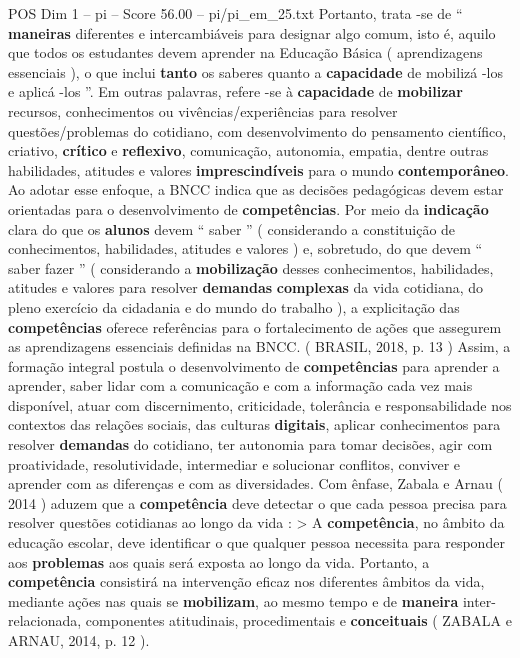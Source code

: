 \begin{textsample}{POS Dim 1 – pi – Score 56.00 – pi/pi\_em\_25.txt}
Portanto, trata -se de “ \textbf{maneiras} diferentes e intercambiáveis para designar algo comum, isto é, aquilo que todos os estudantes devem aprender na Educação Básica ( aprendizagens essenciais ), o que inclui \textbf{tanto} os saberes quanto a \textbf{capacidade} de mobilizá -los e aplicá -los ”.
Em outras palavras, refere -se à \textbf{capacidade} de \textbf{mobilizar} recursos, conhecimentos ou vivências/experiências para resolver questões/problemas do cotidiano, com desenvolvimento do pensamento científico, criativo, \textbf{crítico} e \textbf{reflexivo}, comunicação, autonomia, empatia, dentre outras habilidades, atitudes e valores \textbf{imprescindíveis} para o mundo \textbf{contemporâneo}.
Ao adotar esse enfoque, a BNCC indica que as decisões pedagógicas devem estar orientadas para o desenvolvimento de \textbf{competências}.
Por meio da \textbf{indicação} clara do que os \textbf{alunos} devem “ saber ” ( considerando a constituição de conhecimentos, habilidades, atitudes e valores ) e, sobretudo, do que devem “ saber fazer ” ( considerando a \textbf{mobilização} desses conhecimentos, habilidades, atitudes e valores para resolver \textbf{demandas} \textbf{complexas} da vida cotidiana, do pleno exercício da cidadania e do mundo do trabalho ), a explicitação das \textbf{competências} oferece referências para o fortalecimento de ações que assegurem as aprendizagens essenciais definidas na BNCC. ( BRASIL, 2018, p. 13 ) Assim, a formação integral postula o desenvolvimento de \textbf{competências} para aprender a aprender, saber lidar com a comunicação e com a informação cada vez mais disponível, atuar com discernimento, criticidade, tolerância e responsabilidade nos contextos das relações sociais, das culturas \textbf{digitais}, aplicar conhecimentos para resolver \textbf{demandas} do cotidiano, ter autonomia para tomar decisões, agir com proatividade, resolutividade, intermediar e solucionar conflitos, conviver e aprender com as diferenças e com as diversidades.
Com ênfase, Zabala e Arnau ( 2014 ) aduzem que a \textbf{competência} deve detectar o que cada pessoa precisa para resolver questões cotidianas ao longo da vida : > A \textbf{competência}, no âmbito da educação escolar, deve identificar o que qualquer pessoa necessita para responder aos \textbf{problemas} aos quais será exposta ao longo da vida.
Portanto, a \textbf{competência} consistirá na intervenção eficaz nos diferentes âmbitos da vida, mediante ações nas quais se \textbf{mobilizam}, ao mesmo tempo e de \textbf{maneira} inter-relacionada, componentes atitudinais, procedimentais e \textbf{conceituais} ( ZABALA e ARNAU, 2014, p. 12 ).

\end{textsample}
